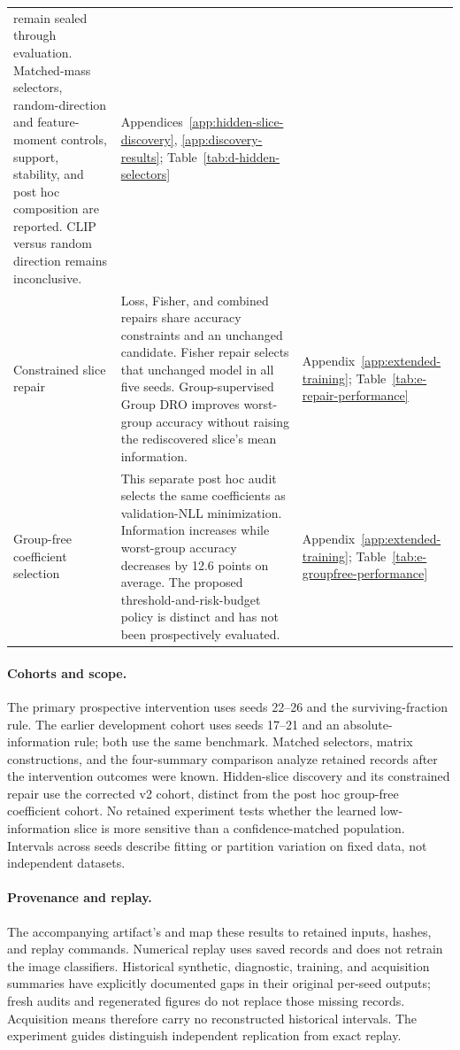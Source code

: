 \begin{longtable}{@{}>{\raggedright\arraybackslash}p{.20\linewidth}
                  >{\raggedright\arraybackslash}p{.52\linewidth}
                  >{\raggedright\arraybackslash}p{.23\linewidth}@{}}
remain sealed through evaluation. Matched-mass selectors, random-direction and
feature-moment controls, support, stability, and post hoc composition are
reported. CLIP versus random direction remains inconclusive. &
Appendices~\ref{app:hidden-slice-discovery}, \ref{app:discovery-results};
Table~\ref{tab:d-hidden-selectors} \\
\addlinespace
Constrained slice repair &
Loss, Fisher, and combined repairs share accuracy constraints and an unchanged
candidate. Fisher repair selects that unchanged model in all five seeds.
Group-supervised Group DRO improves worst-group accuracy without raising the
rediscovered slice's mean information. &
Appendix~\ref{app:extended-training};
Table~\ref{tab:e-repair-performance} \\
\addlinespace
Group-free coefficient selection &
This separate post hoc audit selects the same coefficients as validation-NLL
minimization. Information increases while worst-group accuracy decreases by
12.6 points on average. The proposed threshold-and-risk-budget policy is
distinct and has not been prospectively evaluated. &
Appendix~\ref{app:extended-training};
Table~\ref{tab:e-groupfree-performance} \\
\bottomrule
\end{longtable}
\endgroup

\paragraph{Cohorts and scope.}
The primary prospective intervention uses seeds 22--26 and the surviving-fraction
rule. The earlier development cohort uses seeds 17--21 and an absolute-information
rule; both use the same benchmark. Matched selectors, matrix constructions, and
the four-summary comparison analyze retained records after the intervention
outcomes were known. Hidden-slice discovery and its constrained repair use the
corrected v2 cohort, distinct from the post hoc group-free coefficient cohort.
No retained experiment tests whether the learned low-information slice is more
sensitive than a confidence-matched population. Intervals across seeds describe
fitting or partition variation on fixed data, not independent datasets.

\paragraph{Provenance and replay.}
The accompanying artifact's  and
 map these results to retained inputs, hashes, and
replay commands. Numerical replay uses saved records and does not retrain the
image classifiers. Historical synthetic, diagnostic, training, and acquisition
summaries have explicitly documented gaps in their original per-seed outputs;
fresh audits and regenerated figures do not replace those missing records.
Acquisition means therefore carry no reconstructed historical intervals.
The experiment guides distinguish independent replication from exact replay.
